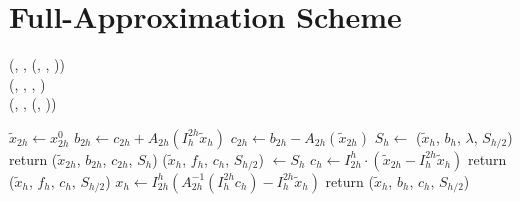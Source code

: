 \section{Full-Approximation Scheme}
\label{appendix:fas}
\begin{bnf*}
 {
	(\bnfts{$\omega$}, \bnfsp \bnfes, \bnfsp {}(, , \bnfsp {}))
 }
 \\
 {
    (, \bnfsp {}, \bnfsp {}, )
	}
 \\
 {
	(, \bnfsp {}, \bnfsp {}(, \bnfsp {}))
}
\end{bnf*}
\begin{table}[!htb]
	\begin{algorithmic}
	\State $\tilde{x}_{2h} \gets x_{2h}^0$ 
	\State $b_{2h} \gets c_{2h} + A_{2h} \left( I_{h}^{2h} \tilde{x}_h \right) $
	\State $c_{2h} \gets b_{2h} - A_{2h} \left( \tilde{x}_{2h} \right)$ 
	\State $S_h \gets$ ($\tilde{x}_{h}$, $b_{h}$, $\lambda$, $S_{h/2}$)
	\State return ($\tilde{x}_{2h}$, $b_{2h}$, $c_{2h}$, $S_h$)
	\EndFunction
	\State
	\State ($\tilde{x}_h$, $f_{h}$, $c_h$, $S_{h/2}$) $\gets S_{h}$
	\State $c_h \gets I_{2h}^{h} \cdot (\tilde{x}_{2h} - I_{h}^{2h} \tilde{x}_h)$
	\State return ($\tilde{x}_h$, $f_{h}$, $c_h$, $S_{h/2}$)
	\EndFunction
    \State
	\State $x_{h} \gets I_{2h}^{h} \left( A_{2h}^{-1}\left( I_{h}^{2h} c_h \right) - I_{h}^{2h} \tilde{x}_h \right)$ 
	\State return ($\tilde{x}_{h}$, $b_{h}$, $c_{h}$, $S_{h/2}$)
	\EndFunction
	\end{algorithmic}
\end{table}